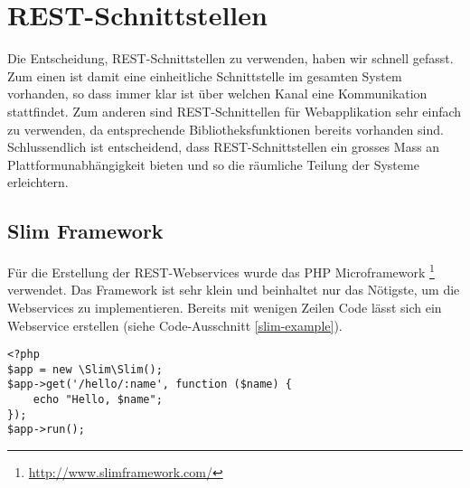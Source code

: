\section{REST-Schnittstellen}
Die Entscheidung, \gls{REST}-Schnittstellen zu verwenden, haben wir schnell gefasst. 
Zum einen ist damit eine einheitliche Schnittstelle im gesamten System vorhanden, so dass immer klar ist über welchen Kanal eine Kommunikation stattfindet.
Zum anderen sind \gls{REST}-Schnittellen für Webapplikation sehr einfach zu verwenden, da entsprechende Bibliotheksfunktionen bereits vorhanden sind.
Schlussendlich ist entscheidend, dass \gls{REST}-Schnittstellen ein grosses Mass an Plattformunabhängigkeit bieten und so die räumliche Teilung der Systeme erleichtern.

\subsection{Slim Framework}
Für die Erstellung der \gls{REST}-Webservices wurde das PHP Microframework \footnote{\url{http://www.slimframework.com/}} verwendet.
Das Framework ist sehr klein und beinhaltet nur das Nötigste, um die Webservices zu implementieren.
Bereits mit wenigen Zeilen Code lässt sich ein Webservice erstellen (siehe Code-Ausschnitt \ref{slim-example}).

\lstset{language=PHP}
\begin{lstlisting}[caption=Beispiel REST-Webservice in Slim, label=slim-example]
<?php
$app = new \Slim\Slim();
$app->get('/hello/:name', function ($name) {
    echo "Hello, $name";
});
$app->run();
\end{lstlisting}













